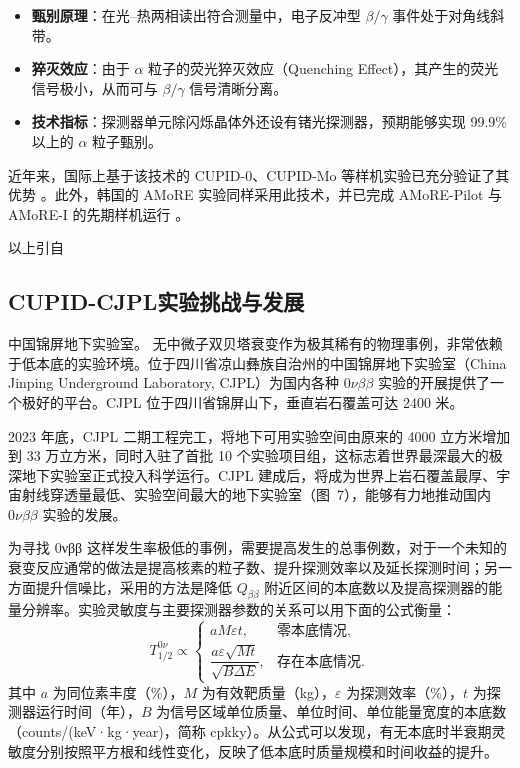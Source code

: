 \documentclass[type=master]{fduthesis}
\begin{document}
\begin{itemize}
    \item \textbf{甄别原理}：在光--热两相读出符合测量中，电子反冲型 $\beta/\gamma$ 事件处于对角线斜带。
    \item \textbf{猝灭效应}：由于 $\alpha$ 粒子的荧光猝灭效应（Quenching Effect），其产生的荧光信号极小，从而可与 $\beta/\gamma$ 信号清晰分离。
    \item \textbf{技术指标}：探测器单元除闪烁晶体外还设有锗光探测器，预期能够实现 99.9\% 以上的 $\alpha$ 粒子甄别。
\end{itemize}

近年来，国际上基于该技术的 CUPID-0、CUPID-Mo 等样机实验已充分验证了其优势 \cite{Optimization2022, Characterization2021, Precise2020}。此外，韩国的 AMoRE 实验同样采用此技术，并已完成 AMoRE-Pilot 与 AMoRE-I 的先期样机运行 \cite{AMoRE2022}。

{\color{blue} 以上引自}\cite{Cao2025Jinping} 








\subsection{CUPID-CJPL实验挑战与发展}
中国锦屏地下实验室。
无中微子双贝塔衰变作为极其稀有的物理事例，非常依赖于低本底的实验环境。位于四川省凉山彝族自治州的中国锦屏地下实验室（China Jinping Underground Laboratory, CJPL）为国内各种 $0\nu\beta\beta$ 实验的开展提供了一个极好的平台。CJPL 位于四川省锦屏山下，垂直岩石覆盖可达 2400 米。

2023 年底，CJPL 二期工程完工，将地下可用实验空间由原来的 4000 立方米增加到 33 万立方米，同时入驻了首批 10 个实验项目组，这标志着世界最深最大的极深地下实验室正式投入科学运行。CJPL 建成后，将成为世界上岩石覆盖最厚、宇宙射线穿透量最低、实验空间最大的地下实验室（图~7），能够有力地推动国内 $0\nu\beta\beta$ 实验的发展。

为寻找 0νββ 这样发生率极低的事例，需要提高发生的总事例数，对于一个未知的衰变反应通常的做法是提高核素的粒子数、提升探测效率以及延长探测时间；另一方面提升信噪比，采用的方法是降低 $Q_{\beta\beta}$ 附近区间的本底数以及提高探测器的能量分辨率。实验灵敏度与主要探测器参数的关系可以用下面的公式衡量\cite{CAS2020}：
\begin{equation}T^{0\nu}_{1/2} \propto 
\begin{cases}a M \varepsilon t, & \text{零本底情况},\\[6pt]\dfrac{a \varepsilon \sqrt{M t}}{\sqrt{B \Delta E}}, & \text{存在本底情况}.\end{cases}\label{eq:sensitivity}\end{equation}
其中 $a$ 为同位素丰度（\%），$M$ 为有效靶质量（kg），$\varepsilon$ 为探测效率（\%），$t$ 为探测器运行时间（年），$B$ 为信号区域单位质量、单位时间、单位能量宽度的本底数（counts/(keV·kg·year)，简称 cpkky）。从公式可以发现，有无本底时半衰期灵敏度分别按照平方根和线性变化，反映了低本底时质量规模和时间收益的提升。
\end{document}
